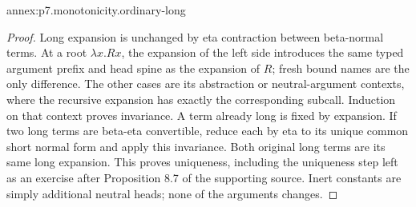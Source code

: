 \begin{annexitem}{annex:p7.monotonicity.ordinary-long}
\begin{proof}
Long expansion is unchanged by eta contraction between beta-normal terms.
At a root \(\lambda x.Rx\), the expansion of the left side introduces the
same typed argument prefix and head spine as the expansion of \(R\);
fresh bound names are the only difference. The other cases are its
abstraction or neutral-argument contexts, where the recursive expansion
has exactly the corresponding subcall. Induction on that context proves
invariance. A term already long is fixed by expansion.
If two long terms are beta-eta convertible, reduce each by eta to its
unique common short normal form and apply this invariance. Both original
long terms are its same long expansion. This proves uniqueness, including
the uniqueness step left as an exercise after Proposition 8.7 of the
supporting source. Inert constants are simply additional neutral heads;
none of the arguments changes.
\end{proof}
\end{annexitem}

